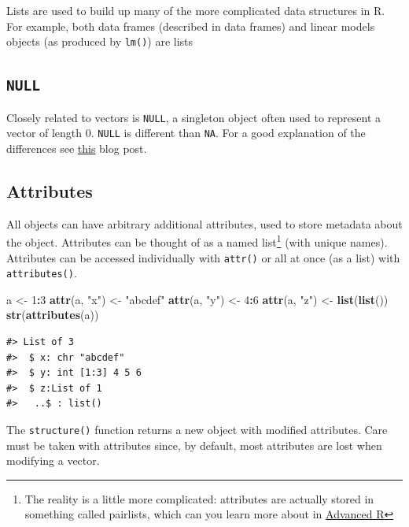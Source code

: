 \documentclass[]{book}
\newenvironment{Shaded}{\begin{snugshade}}{\end{snugshade}}
\newcommand{\KeywordTok}[1]{\textcolor[rgb]{0.13,0.29,0.53}{\textbf{#1}}}
\newcommand{\DecValTok}[1]{\textcolor[rgb]{0.00,0.00,0.81}{#1}}
\newcommand{\StringTok}[1]{\textcolor[rgb]{0.31,0.60,0.02}{#1}}
\newcommand{\OperatorTok}[1]{\textcolor[rgb]{0.81,0.36,0.00}{\textbf{#1}}}
\newcommand{\NormalTok}[1]{#1}
\let\rmarkdownfootnote\footnote%
\def\footnote{\protect\rmarkdownfootnote}
\theoremstyle{definition}
\theoremstyle{definition}
\theoremstyle{definition}
\theoremstyle{remark}
\begin{document}
Lists are used to build up many of the more complicated data structures
in R. For example, both data frames (described in data frames) and
linear models objects (as produced by \texttt{lm()}) are lists

\subsection{\texorpdfstring{\texttt{NULL}}{NULL}}\label{null}

Closely related to vectors is \texttt{NULL}, a singleton object often
used to represent a vector of length 0. \texttt{NULL} is different than
\texttt{NA}. For a good explanation of the differences see
\href{https://www.r-bloggers.com/r-na-vs-null/}{this} blog post.

\subsection{Attributes}\label{attributes}

All objects can have arbitrary additional attributes, used to store
metadata about the object. Attributes can be thought of as a named
list\footnote{The reality is a little more complicated: attributes are
  actually stored in something called pairlists, which can you learn
  more about in \href{http://adv-r.had.co.nz}{Advanced R}} (with unique
names). Attributes can be accessed individually with \texttt{attr()} or
all at once (as a list) with \texttt{attributes()}.

\begin{Shaded}
\begin{Highlighting}[]
\NormalTok{a <-}\StringTok{ }\DecValTok{1}\OperatorTok{:}\DecValTok{3}
\KeywordTok{attr}\NormalTok{(a, }\StringTok{"x"}\NormalTok{) <-}\StringTok{ "abcdef"}
\KeywordTok{attr}\NormalTok{(a, }\StringTok{"y"}\NormalTok{) <-}\StringTok{ }\DecValTok{4}\OperatorTok{:}\DecValTok{6}
\KeywordTok{attr}\NormalTok{(a, }\StringTok{"z"}\NormalTok{) <-}\StringTok{ }\KeywordTok{list}\NormalTok{(}\KeywordTok{list}\NormalTok{())}
\KeywordTok{str}\NormalTok{(}\KeywordTok{attributes}\NormalTok{(a))}
\end{Highlighting}
\end{Shaded}

\begin{verbatim}
#> List of 3
#>  $ x: chr "abcdef"
#>  $ y: int [1:3] 4 5 6
#>  $ z:List of 1
#>   ..$ : list()
\end{verbatim}

The \texttt{structure()} function returns a new object with modified
attributes. Care must be taken with attributes since, by default, most
attributes are lost when modifying a vector.
\end{document}
